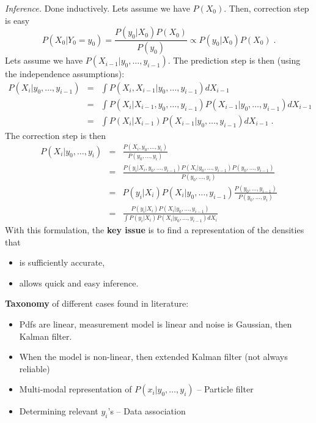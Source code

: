 \documentclass[a4paper,12pt]{article}
\begin{document}
{\it Inference.} Done inductively. Lets assume we have $P(X_0)$. Then, correction step is easy
$$P(X_0|Y_0=y_0) = \frac{P(y_0|X_0)P(X_0)}{P(y_0)} \propto P(y_0|X_0)P(X_0)\;.$$
Lets assume we have $P(X_{i-1}|y_0,\ldots,y_{i-1})$. The prediction step is then (using the independence assumptions):
\begin{eqnarray*}
P(X_i|y_0,\ldots,y_{i-1}) &=& \int P(X_i,X_{i-1}|y_0,\ldots,y_{i-1})dX_{i-1}\\
&=& \int P(X_i|X_{i-1},y_0,\ldots,y_{i-1}) P(X_{i-1}|y_0,\ldots,y_{i-1})dX_{i-1}\\
&=& \int P(X_i|X_{i-1})P(X_{i-1}|y_0,\ldots,y_{i-1})dX_{i-1}\;.
\end{eqnarray*}
The correction step is then
\begin{eqnarray*}
P(X_i|y_0,\ldots,y_i) &=& \frac{P(X_i,y_0,\ldots,y_i)}{P(y_0,\ldots,y_i)}\\
&=& \frac{P(y_i|X_i,y_0,\ldots,y_{i-1}) P(X_i|y_0,\ldots,y_{i-1}) P(y_0,\ldots,y_{i-1})}{P(y_0,\ldots,y_i)}\\
&=& P(y_i|X_i) P(X_i|y_0,\ldots,y_{i-1})\frac{P(y_0,\ldots,y_{i-1})}{P(y_0,\ldots,y_i)}\\
&=& \frac{P(y_i|X_i) P(X_i|y_0,\ldots,y_{i-1})}{\int P(y_i|X_i) P(X_i|y_0,\ldots,y_{i-1}) dX_i}
\end{eqnarray*}
With this formulation, the {\bf key issue} is to find a representation of the densities that
\begin{itemize}
\item is sufficiently accurate,
\item allows quick and easy inference.
\end{itemize} 
{\bf Taxonomy} of different cases found in literature:
\begin{itemize}
\item Pdfs are linear, measurement model is linear and noise is Gaussian, then Kalman filter.
\item When the model is non-linear, then extended Kalman filter (not always reliable)
\item Multi-modal representation of $P(x_i|y_0,\ldots,y_i)$ -- Particle filter
\item Determining relevant $y_i$'s -- Data association
\end{itemize}  
\end{document}
